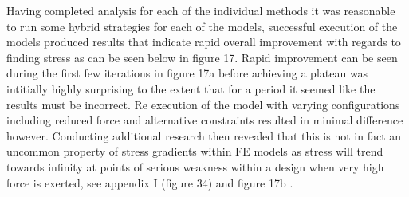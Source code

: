 \noindent
Having completed analysis for each of the individual methods it was reasonable to run some hybrid strategies for each of the models, successful execution of the models produced results that indicate rapid overall improvement with regards to finding stress as can be seen below in figure 17. Rapid improvement can be seen during the first few iterations in figure 17a before achieving a plateau was intitially highly surprising to the extent that for a period it seemed like the results must be incorrect. Re execution of the model with varying configurations including reduced force and alternative constraints resulted in minimal difference however. Conducting additional research then revealed that this is not in fact an uncommon property of stress gradients within FE models as stress will trend towards infinity at points of serious weakness within a design when very high force is exerted, see appendix I (figure 34) and figure 17b \cite{StressConcerntration}.  \\

